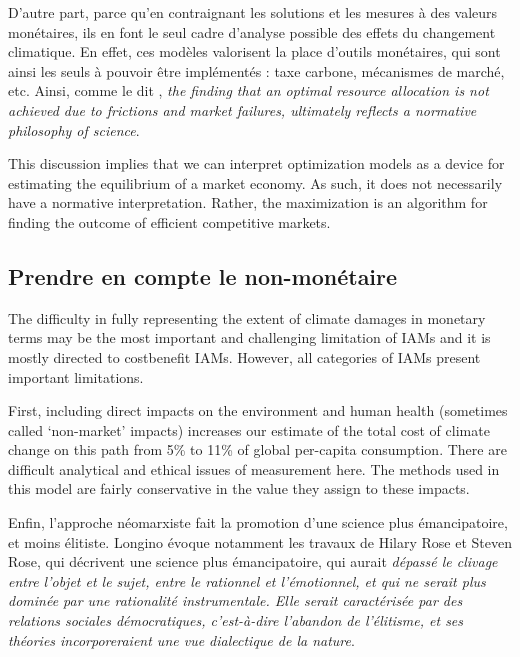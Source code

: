 D'autre part, parce qu'en contraignant les solutions et les mesures à des valeurs monétaires, ils en font le seul cadre d'analyse possible des effets du changement climatique. En effet, ces modèles valorisent la place d'outils monétaires, qui sont ainsi les seuls à pouvoir être implémentés : taxe carbone, mécanismes de marché, etc. Ainsi, comme le dit \textcite{mercure_modelling_2019}, \emph{the finding that an optimal resource allocation is not achieved due to frictions and market failures, ultimately reflects a normative philosophy of science}. 

\begin{authoredquote}
    This discussion implies that we can interpret optimization models as a device for estimating the equilibrium of a market economy. As such, it does not necessarily have a normative interpretation. Rather, the maximization is an algorithm for finding the outcome of efficient competitive markets.
\end{authoredquote}



\subsection{Prendre en compte le non-monétaire}


\begin{authoredquote}
    The difficulty in fully representing the extent of climate damages in monetary terms may be the most important and challenging limitation of IAMs and it is mostly directed to costbenefit IAMs. However, all categories of IAMs present important limitations.
\end{authoredquote}




\begin{authoredquote}
    First, including direct impacts on the environment and human health (sometimes called ‘non-market’ impacts) increases our estimate of the total cost of climate change on this path from 5\% to 11\% of global per-capita consumption. There are difficult analytical and ethical issues of measurement here. The methods used in this model are fairly conservative in the value they assign to these impacts.  
\end{authoredquote}

Enfin, l'approche néomarxiste fait la promotion d'une science plus émancipatoire, et moins élitiste. Longino évoque notamment les travaux de Hilary Rose et Steven Rose, qui décrivent une science plus émancipatoire, qui aurait \emph{dépassé le clivage entre l'objet et le sujet, entre le rationnel et l'émotionnel, et qui ne serait plus dominée par une rationalité instrumentale. Elle serait caractérisée par des relations sociales démocratiques, c'est-à-dire l'abandon de l'élitisme, et ses théories incorporeraient une vue dialectique de la nature}.


